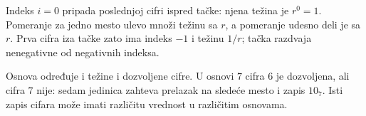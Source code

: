 
Indeks $i=0$ pripada poslednjoj cifri ispred tačke: njena težina je $r^0=1$. Pomeranje za jedno mesto ulevo množi težinu sa $r$, a pomeranje udesno deli je sa $r$. Prva cifra iza tačke zato ima indeks $-1$ i težinu $1/r$; tačka razdvaja nenegativne od negativnih indeksa.

Osnova određuje i težine i dozvoljene cifre. U osnovi $7$ cifra $6$ je dozvoljena, ali cifra $7$ nije: sedam jedinica zahteva prelazak na sledeće mesto i zapis $10_7$. Isti zapis cifara može imati različitu vrednost u različitim osnovama.
